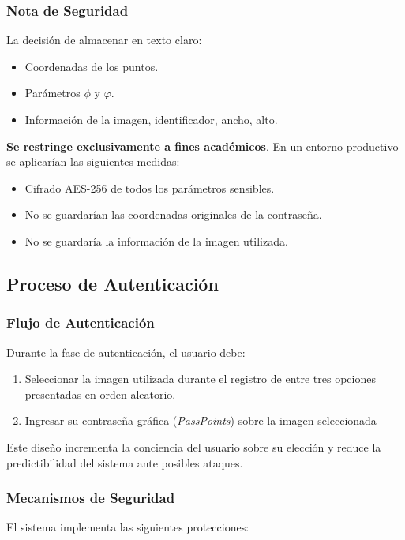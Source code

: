 \subsubsection{Nota de Seguridad}
La decisión de almacenar en texto claro:
\begin{itemize}
	\item Coordenadas de los puntos.
	\item Parámetros $\phi$ y $\varphi$.
	\item Informaci\'on de la imagen, identificador, ancho, alto.
\end{itemize}

\textbf{Se restringe exclusivamente a fines académicos}. En un entorno productivo se aplicarían las siguientes medidas:
\begin{itemize}
	\item Cifrado AES-256 de todos los parámetros sensibles.
	\item No se guardar\'ian las coordenadas originales de la contrase\~na.
	\item No se guardar\'ia la informaci\'on de la imagen utilizada.
\end{itemize}

\subsection{Proceso de Autenticación}

\subsubsection{Flujo de Autenticación}
Durante la fase de autenticación, el usuario debe:

\begin{enumerate}
	\item Seleccionar la imagen utilizada durante el registro de entre tres opciones presentadas en orden aleatorio.
	\item Ingresar su contraseña gráfica (\textit{PassPoints}) sobre la imagen seleccionada
\end{enumerate}

Este diseño incrementa la conciencia del usuario sobre su elección y reduce la predictibilidad del sistema ante posibles ataques.

\subsubsection{Mecanismos de Seguridad}
El sistema implementa las siguientes protecciones:

